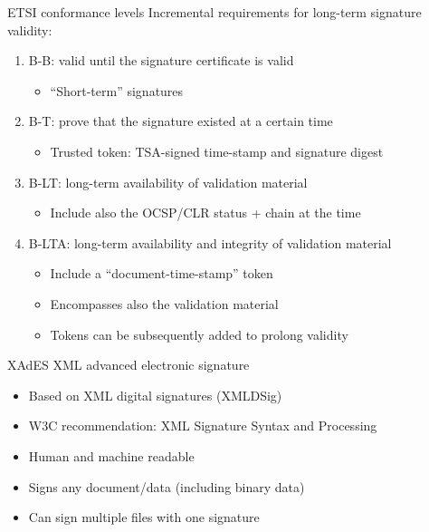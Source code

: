 \begin{frame}{ETSI conformance levels}
  \pause
  Incremental requirements for long-term signature validity:
  \begin{enumerate}[<+(1)->]
    \item B-B: valid until the signature certificate is valid
    \begin{itemize}
      \item \enquote{Short-term} signatures
    \end{itemize}
    \item B-T: prove that the signature existed at a certain time
    \begin{itemize}
      \item Trusted token: TSA-signed time-stamp and signature digest
    \end{itemize}
    \item B-LT: long-term availability of validation material
    \begin{itemize}
      \item Include also the OCSP/CLR status + chain at the time
    \end{itemize}
    \item B-LTA: long-term availability and integrity of validation material
    \begin{itemize}
      \item Include a \enquote{document-time-stamp} token
      \item Encompasses also the validation material
      \item Tokens can be subsequently added to prolong validity
    \end{itemize}
  \end{enumerate}
\end{frame}

\begin{frame}{XAdES}
  XML advanced electronic signature
  \begin{itemize}[<+(1)->]
    \item Based on XML digital signatures (XMLDSig)
    \item W3C recommendation: XML Signature Syntax and Processing
    \item Human and machine readable
    \item Signs any document/data (including binary data)
    \item Can sign multiple files with one signature
  \end{itemize}    
\end{frame}

